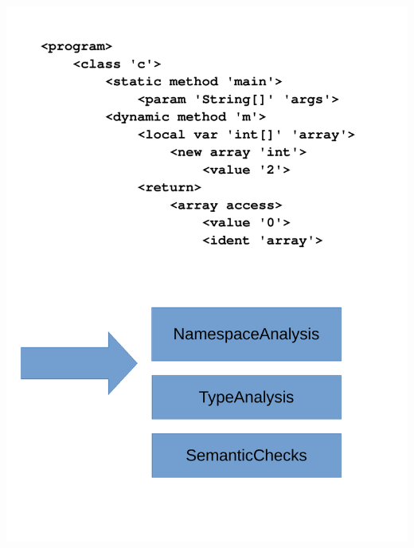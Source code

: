 \documentclass[navbaroff,en]{sdqbeamer}
\begin{document}
\begin{frame}
\begin{columns}
		\begin{column}{0.47\textwidth}
				\centering \includegraphics[scale=0.24]{images/semantic_tests.pdf}
		\end{column}
	\end{columns}

\end{frame}
\end{document}
